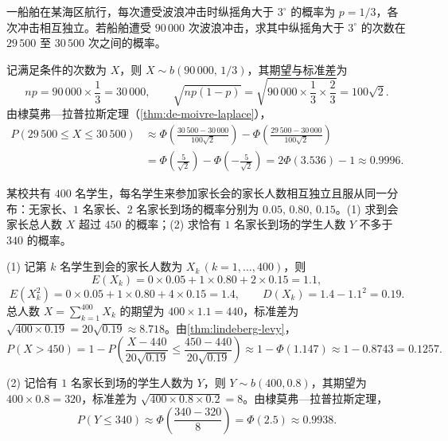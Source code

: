 \begin{example}[title={大样本二项分布的正态近似}]
\label{eg:ship-wave}
一船舶在某海区航行，每次遭受波浪冲击时纵摇角大于 $3^\circ$ 的概率为 $p=1/3$，各次冲击相互独立。若船舶遭受 $90\,000$ 次波浪冲击，求其中纵摇角大于 $3^\circ$ 的次数在 $29\,500$ 至 $30\,500$ 次之间的概率。
\begin{solution}
记满足条件的次数为 $X$，则 $X\sim b(90\,000,\,1/3)$，其期望与标准差为
\[
  np=90\,000\times\frac{1}{3}=30\,000,\qquad
  \sqrt{np(1-p)}=\sqrt{90\,000\times\frac{1}{3}\times\frac{2}{3}}=100\sqrt{2}.
\]
由棣莫弗—拉普拉斯定理（\cref{thm:de-moivre-laplace}），
\[
\begin{aligned}
  P(29\,500\le X\le 30\,500)
  &\approx\Phi\!\left(\frac{30\,500-30\,000}{100\sqrt{2}}\right)-\Phi\!\left(\frac{29\,500-30\,000}{100\sqrt{2}}\right)\\
  &=\Phi\!\left(\frac{5}{\sqrt{2}}\right)-\Phi\!\left(-\frac{5}{\sqrt{2}}\right)
  =2\Phi(3.536)-1\approx 0.9996.
\end{aligned}
\]
\end{solution}
\end{example}

\begin{example}[title={家长会人数的两类中心极限定理计算}]
\label{eg:parent-meeting}
某校共有 $400$ 名学生，每名学生来参加家长会的家长人数相互独立且服从同一分布：无家长、$1$ 名家长、$2$ 名家长到场的概率分别为 $0.05,\,0.80,\,0.15$。(1) 求到会家长总人数 $X$ 超过 $450$ 的概率；(2) 求恰有 $1$ 名家长到场的学生人数 $Y$ 不多于 $340$ 的概率。
\begin{solution}
(1) 记第 $k$ 名学生到会的家长人数为 $X_k\,(k=1,\ldots,400)$，则
\[
  E(X_k)=0\times 0.05+1\times 0.80+2\times 0.15=1.1,
\]
\[
  E(X_k^2)=0\times 0.05+1\times 0.80+4\times 0.15=1.4,\qquad
  D(X_k)=1.4-1.1^2=0.19.
\]
总人数 $X=\sum_{k=1}^{400}X_k$ 的期望为 $400\times 1.1=440$，标准差为 $\sqrt{400\times 0.19}=20\sqrt{0.19}\approx 8.718$。由\cref{thm:lindeberg-levy}，
\[
  P(X>450)=1-P\!\left(\frac{X-440}{20\sqrt{0.19}}\le\frac{450-440}{20\sqrt{0.19}}\right)
  \approx 1-\Phi(1.147)\approx 1-0.8743=0.1257.
\]

(2) 记恰有 $1$ 名家长到场的学生人数为 $Y$，则 $Y\sim b(400,0.8)$，其期望为 $400\times 0.8=320$，标准差为 $\sqrt{400\times 0.8\times 0.2}=8$。由棣莫弗—拉普拉斯定理，
\[
  P(Y\le 340)\approx\Phi\!\left(\frac{340-320}{8}\right)=\Phi(2.5)\approx 0.9938.
\]
\end{solution}
\end{example}

